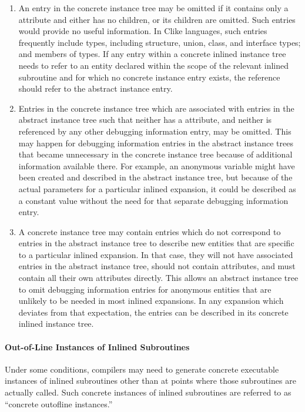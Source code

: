 \begin{enumerate}[1.]
\item An entry in the concrete instance tree may be omitted if
it contains only a 
 attribute and either
has no children, or its children are omitted. Such entries
would provide no useful information. In C\dash like languages,
such entries frequently include types, including structure,
union, class, and interface types; and members of types. If any
entry within a concrete inlined instance tree needs to refer
to an entity declared within the scope of the relevant inlined
subroutine and for which no concrete instance entry exists,
the reference should refer to the abstract instance entry.

\item Entries in the concrete instance tree which are associated
with entries in the abstract instance tree such that neither
has a  attribute, and neither is referenced by
any other debugging information entry, may be omitted. This
may happen for debugging information entries in the abstract
instance trees that became unnecessary in the concrete instance
tree because of additional information available there. For
example, an anonymous variable might have been created and
described in the abstract instance tree, but because of
the actual parameters for a particular inlined expansion,
it could be described as a constant value without the need
for that separate debugging information entry.

\item A concrete instance tree may contain entries which do
not correspond to entries in the abstract instance tree
to describe new entities that are specific to a particular
inlined expansion. In that case, they will not have associated
entries in the abstract instance tree, should not contain
 attributes, and must contain all their
own attributes directly. This allows an abstract instance tree
to omit debugging information entries for anonymous entities
that are unlikely to be needed in most inlined expansions. In
any expansion which deviates from that expectation, the
entries can be described in its concrete inlined instance tree.

\end{enumerate}

\paragraph{Out-of-Line Instances of Inlined Subroutines}
\label{chap:outoflineinstancesofinlinedsubroutines}
Under some conditions, compilers may need to generate concrete
executable instances of inlined subroutines other than at
points where those subroutines are actually called. Such
concrete instances of inlined subroutines are referred to as
``concrete out\dash of\dash line instances.''

